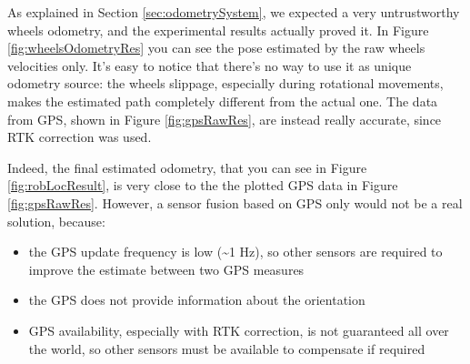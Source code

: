 \par As explained in Section \ref{sec:odometrySystem}, we expected a very untrustworthy wheels odometry, and the experimental results actually proved it. In Figure \ref{fig:wheelsOdometryRes} you can see the pose estimated by the raw wheels velocities only. It's easy to notice that there's no way to use it as unique odometry source: the wheels slippage, especially during rotational movements, makes the estimated path completely different from the actual one. The data from GPS, shown in Figure \ref{fig:gpsRawRes}, are instead really accurate, since RTK correction was used. 
\par Indeed, the final estimated odometry, that you can see in Figure \ref{fig:robLocResult}, is very close to the the plotted GPS data in Figure \ref{fig:gpsRawRes}. However, a sensor fusion based on GPS only would not be a real solution, because:
\begin{itemize}
	\item the GPS update frequency is low (\textasciitilde1 Hz), so other sensors are required to improve the estimate between two GPS measures
	\item the GPS does not provide information about the orientation
	\item GPS availability, especially with RTK correction, is not guaranteed all over the world, so other sensors must be available to compensate if required
\end{itemize}

